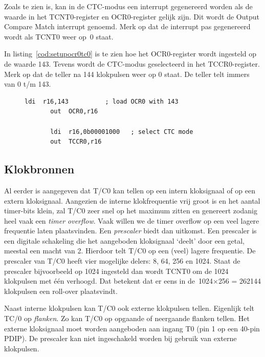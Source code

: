 Zoals te zien is, kan in de CTC-modus een interrupt gegenereerd worden als
de waarde in het TCNT0-register en OCR0-register gelijk zijn. Dit wordt
de Output Compare Match interrupt genoemd. Merk op dat de interrupt pas
gegenereerd wordt als TCNT0 weer op~0 staat.

In listing~\ref{cod:setupocr0tc0} is te zien hoe het OCR0-register wordt
ingesteld op de waarde 143. Tevens wordt de CTC-modus geselecteerd in het
TCCR0-register. Merk op dat de teller na 144 klokpulsen weer op 0 staat.
De teller telt immers van 0 t/m 143.

\begin{figure}[!ht]
\begin{lstlisting}[language=AVRassembler,caption=Instellen van het OCR0-register van T/C0,label=cod:setupocr0tc0]
       ldi  r16,143          ; load OCR0 with 143
       out  OCR0,r16
       
       ldi  r16,0b00001000   ; select CTC mode 
       out  TCCR0,r16
\end{lstlisting}
\end{figure}

\subsection{Klokbronnen}
Al eerder is aangegeven dat T/C0 kan tellen op een intern kloksignaal of
op een extern kloksignaal. Aangezien de interne klokfrequentie vrij groot is
en het aantal timer-bits klein, zal T/C0 zeer snel op het maximum zitten en
genereert zodanig heel vaak een \textsl{timer overflow}. Vaak willen we de
timer overflow op een veel lagere frequentie laten plaatsvinden.
Een \textsl{prescaler} biedt dan uitkomst. Een prescaler is een digitale
schakeling die het aangeboden kloksignaal `deelt' door een getal, meestal een
macht van 2. Hierdoor telt T/C0 op een (veel) lagere frequentie. De prescaler
van T/C0 heeft vier mogelijke delers: 8, 64, 256 en 1024. Staat de prescaler
bijvoorbeeld op 1024 ingesteld dan wordt TCNT0 om de 1024 klokpulsen met
\'e\'en verhoogd. Dat betekent dat er eens in de~1024$\times$256 = 262144
klokpulsen 
een roll-over plaatsvindt.

Naast interne klokpulsen kan T/C0 ook externe klokpulsen tellen. Eigenlijk
telt TC/0 op \textsl{flanken}. Zo kan T/C0 op opgaande of neergaande flanken
tellen. Het externe kloksignaal moet worden aangeboden aan ingang T0
(pin 1 op een 40-pin PDIP). De prescaler kan niet ingeschakeld worden bij
gebruik van externe klokpulsen.

